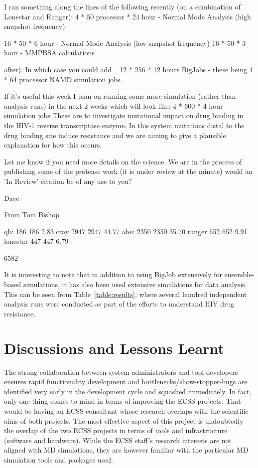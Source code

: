 \documentclass{sig-alternate}
\begin{document}
I ran something along the lines of the following recently (on a combination of Lonestar and Ranger):
4 * 50 processor * 24 hour - Normal Mode Analysis (high snapshot frequency)

16 * 50 * 6 hour - Normal Mode Analysis (low snapshot frequency)
16 * 50 * 3 hour - MMPBSA calculations

after). In which case you could add ~ 12 * 256 * 12 hours BigJobs - these being 4 * 64 processor NAMD simulation jobs.

If it's useful this week I plan on running some more simulation (rather than analysis runs) in the next 2 weeks which will look like:
4 * 600 * 4 hour simulation jobs
These are to investigate mutational impact on drug binding in the HIV-1 reverse transcriptase enzyme. In this system mutations distal to the drug binding site induce resistance and we are aiming to give a plausible explanation for how this occurs.

Let me know if you need more details on the science. We are in the process of publishing some of the protease work (it is under review at the minute) would an 'In Review' citation be of any use to you?

Dave


From Tom Bishop

qb: 186	186	2.83%
cray 2947	2947	44.77%
abe: 2350	2350	35.70%
ranger 652	652	9.91%
lonestar 447	447	6.79%

6582	




It is interesting to note that in addition to using BigJob extensively
for ensemble-based simulations, it has also been used extensive
simulations for data analysis. This can be seen from
Table~\ref{table:results}, where several hundred independent analysis runs were
conducted as part of the efforts to understand HIV drug resistance.


\section{Discussions and Lessons Learnt}


The strong collaboration between system administrators and tool
developers ensures rapid functionality development and
bottlenecks/show-stopper-bugs are identified very early in the
development cycle and squashed immediately. In fact, only one thing
comes to mind in terms of improving the ECSS projects. That would be
having an ECSS consultant whose research overlaps with the scientific
aims of both projects. The most effective aspect of this project is undoubtedly
the overlap of the two ECSS projects in terms of tools and infrastructure
(software and hardware). While the ECSS staff's research interests are not
aligned with MD simulations, they are however familiar with the particular MD
simulation tools and packages used.
\end{document}
